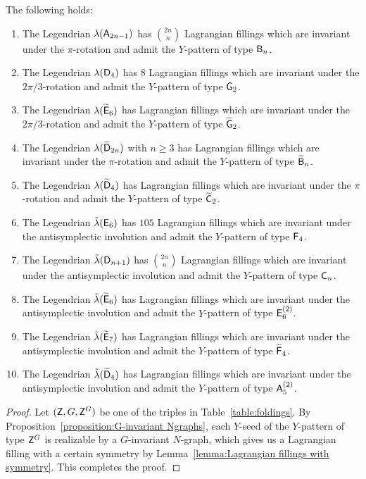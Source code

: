 \begin{theorem}\label{thm:folding of N-graphs}
The following holds:
\begin{enumerate}
\item The Legendrian $\lambda(\mathsf{A}_{2n-1})$ has $\binom{2n}{n}$ Lagrangian fillings which are invariant under the $\pi$-rotation and  admit the $Y$-pattern of type $\mathsf{B}_n$.
\item The Legendrian $\lambda(\mathsf{D}_{4})$ has $8$ Lagrangian fillings which are invariant under the $2\pi/3$-rotation and admit the $Y$-pattern of type $\mathsf{G}_2$.
\item The Legendrian $\lambda(\widetilde{\mathsf{E}}_{6})$ has Lagrangian fillings which are invariant under the $2\pi/3$-rotation and admit the $Y$-pattern of type $\widetilde{\mathsf{G}}_2$.
\item The Legendrian $\lambda(\widetilde{\mathsf{D}}_{2n})$ with $n\ge 3$ has Lagrangian fillings which are invariant under the $\pi$-rotation and admit the $Y$-pattern of type $\widetilde{\mathsf{B}}_n$.
\item The Legendrian $\lambda(\widetilde{\mathsf{D}}_4)$ has Lagrangian fillings which are invariant under the $\pi$-rotation and admit the $Y$-pattern of type $\widetilde{\mathsf{C}}_2$.
%
\item The Legendrian $\tilde\lambda(\mathsf{E}_{6})$ has $105$ Lagrangian fillings which are invariant under the antisymplectic involution and admit the $Y$-pattern of type $\mathsf{F}_4$.
\item The Legendrian $\tilde\lambda(\mathsf{D}_{n+1})$ has $\binom{2n}{n}$ Lagrangian fillings which are invariant under the antisymplectic involution and admit the $Y$-pattern of type $\mathsf{C}_n$.
\item The Legendrian $\tilde\lambda(\widetilde{\mathsf{E}}_{6})$ has Lagrangian fillings which are invariant under the antisymplectic involution and admit the $Y$-pattern of type $\mathsf{E}_6^{(2)}$.
\item The Legendrian $\tilde\lambda(\widetilde{\mathsf{E}}_{7})$ has Lagrangian fillings which are invariant under the antisymplectic involution and admit the $Y$-pattern of type $\widetilde{\mathsf{F}}_4$.
\item The Legendrian $\tilde\lambda(\widetilde{\mathsf{D}}_4)$ has Lagrangian fillings which are invariant under the antisymplectic involution and admit the $Y$-pattern of type $\mathsf{A}_5^{(2)}$.
\end{enumerate}
\end{theorem}
\begin{proof}
Let $(\mathsf{Z}, G,{\mathsf{Z}^G})$ be one of the triples in Table~\ref{table:foldings}.
By Proposition~\ref{proposition:G-invariant Ngraphs}, each $Y$-seed of the $Y$-pattern of type ${\mathsf{Z}^G}$ is realizable by a $G$-invariant $N$-graph, which gives us a Lagrangian filling with a certain symmetry by Lemma~\ref{lemma:Lagrangian fillings with symmetry}.
This completes the proof.
\end{proof}
